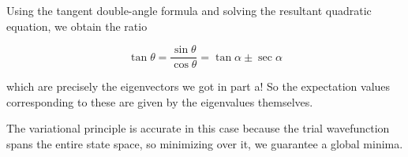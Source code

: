 \begin{alphaparts}
Using the tangent double-angle formula and solving the resultant quadratic
equation, we obtain the ratio

\begin{equation}
    \tan \theta = \frac{\sin \theta}{\cos \theta} = \tan \alpha \pm \sec \alpha
\end{equation}

which are precisely the eigenvectors we got in part a! So the expectation values
corresponding to these are given by the eigenvalues themselves.

The variational principle is accurate in this case because the trial
wavefunction spans the entire state space, so minimizing over it, we guarantee a
global minima.

\end{alphaparts}